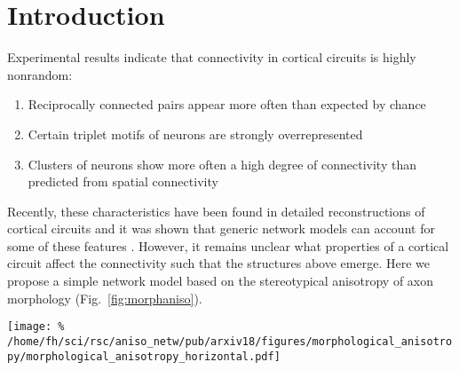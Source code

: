 \section{Introduction}
\vspace{-0.2cm}

Experimental results indicate that connectivity in cortical circuits is highly nonrandom:
\begin{enumerate}[leftmargin=2cm]
  \itemsep0pt
\item Reciprocally connected pairs appear more often than expected by chance \cite{Song2005, Perin2011}
\item Certain triplet motifs of neurons are strongly overrepresented \cite{Song2005}
  \item Clusters of neurons show more often a high degree of connectivity than predicted from spatial connectivity \cite{Perin2011}
  \end{enumerate}

Recently, these characteristics have been found in detailed reconstructions of cortical circuits \cite{Gal2017} and it was shown that generic network models can account for some of these features \cite{vegue2017}. However, it remains unclear what properties of a cortical circuit affect the connectivity such that the structures above emerge. Here we propose a simple network model based on the stereotypical anisotropy of axon morphology (Fig.~\ref{fig:morphaniso}).

\begin{center}\vspace{0.01cm}
  \texttt{[image: \%
    /home/fh/sci/rsc/aniso\_netw/pub/arxiv18/figures/morphological\_anisotropy/morphological\_anisotropy\_horizontal.pdf]}
  \label{fig:morphaniso}
\end{center}\vspace{2cm}


